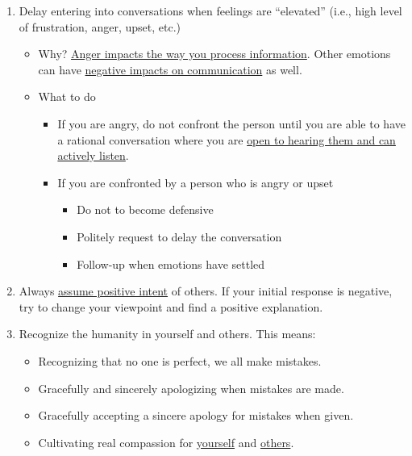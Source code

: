 \documentclass[
  letterpaper,
  DIV=11,
  numbers=noendperiod]{scrreprt}
\providecommand{\tightlist}{%
  \setlength{\itemsep}{0pt}\setlength{\parskip}{0pt}}\usepackage{longtable,booktabs,array}
\begin{document}
\begin{enumerate}
\def\labelenumi{\arabic{enumi}.}
\item
  Delay entering into conversations when feelings are ``elevated''
  (i.e., high level of frustration, anger, upset, etc.)

  \begin{itemize}
  \tightlist
  \item
    Why? \href{https://www.youtube.com/watch?v=d_5DU5opOFk}{Anger
    impacts the way you process information}. Other emotions can have
    \href{https://nulab.com/learn/collaboration/overcoming-emotional-barriers-to-communication/}{negative
    impacts on communication} as well.\\
  \item
    What to do

    \begin{itemize}
    \tightlist
    \item
      If you are angry, do not confront the person until you are able to
      have a rational conversation where you are
      \href{https://welldoing.org/article/how-communicate-when-youre-angry}{open
      to hearing them and can actively listen}.\\
    \item
      If you are confronted by a person who is angry or upset

      \begin{itemize}
      \tightlist
      \item
        Do not to become defensive\\
      \item
        Politely request to delay the conversation\\
      \item
        Follow-up when emotions have settled
      \end{itemize}
    \end{itemize}
  \end{itemize}
\item
  Always
  \href{https://www.axios.com/2022/06/03/simple-workplace-principle-assume-positive-intent}{assume
  positive intent} of others. If your initial response is negative, try
  to change your viewpoint and find a positive explanation.
\item
  Recognize the humanity in yourself and others. This means:

  \begin{itemize}
  \tightlist
  \item
    Recognizing that no one is perfect, we all make mistakes.\\
  \item
    Gracefully and sincerely apologizing when mistakes are made.\\
  \item
    Gracefully accepting a sincere apology for mistakes when given.\\
  \item
    Cultivating real compassion for
    \href{https://youtu.be/-kfUE41-JFw}{yourself} and
    \href{https://www.youtube.com/watch?v=46bRW1pYgoY}{others}.
  \end{itemize}
\end{enumerate}
\end{document}

